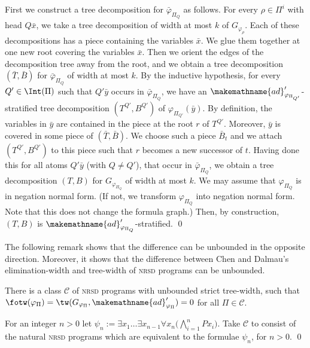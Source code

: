\documentclass{LMCS}
\newcommand{\nrsd}{\textsc{nrsd}}
\renewcommand{\phi}{\varphi}
\newcommand{\alte}{\makemathname{ad}}
\begin{document}
First we construct a tree decomposition for 
$\bar \phi_{\Pi_Q}$ as follows.
For every $\rho\in\Pi^i$ with head $Q\bar x$,
we take a tree decomposition 
of width at most $k$ of $G_{\phi_{\rho}}$. Each
of these decompositions has a piece containing 
the variables $\bar x$.
We glue them
together at one new root covering the variables
$\bar x$. Then we orient the edges of the decomposition tree 
away from the root, and we obtain a tree decomposition
$(\bar T,\bar B)$ for $\bar \phi_{\Pi_Q}$ of width at most $k$.
By the inductive 
hypothesis, for every $Q'\in\Int(\Pi)$ such that
$Q'\bar y$ occurs in $\bar \phi_{\Pi_Q}$,
we have an $\alte'_{\phi_{\Pi_{Q'}}}$-stratified tree decomposition $(T^{Q'},B^{Q'})$ of
$\phi_{\Pi_{Q'}}(\bar y)$. By definition, the variables in $\bar y$
are contained in the piece at the root $r$ of $T^{Q'}$. Moreover, $\bar y$
is covered in some piece of $(\bar T,\bar B)$. We choose such a piece $\bar B_t$
and we attach $(T^{Q'},B^{Q'})$
to this piece such that $r$ becomes a new successor of $t$. 
Having done this for all atoms $Q'\bar y$ (with $Q\neq Q'$), 
that occur in $\bar \phi_{\Pi_Q}$, we obtain a tree decomposition $(T,B)$ for 
$G_{\phi_{\Pi_Q}}$ of width at most $k$. We may assume that 
$\phi_{\Pi_Q}$ is in negation normal form. (If not, we transform 
$\phi_{\Pi_Q}$ into negation normal form. Note that this does not change
the formula graph.)
Then, by construction, $(T,B)$ is 
$\alte'_{\phi_{\Pi_Q}}$-stratified.
\qed

The following remark shows that the 
difference can be unbounded in the opposite direction. Moreover, it
shows that the difference between Chen and Dalmau's elimination-width 
and tree-width of \nrsd{} programs can be unbounded.

\begin{rem}\label{rem:fotw-better-datalogtw}
	There is a class $\mathcal C$ of \nrsd{} programs with unbounded strict tree-width,
	such that $\fotw(\phi_{\Pi})=\tw(G_{\phi_{\Pi}},\alte'_{\phi_{\Pi}})=0$ 
for all $\Pi\in\mathcal C$. 
\end{rem}
\proof
For an integer $n>0$
let 
$
\psi_n:=\exists x_1\ldots \exists x_{n-1}\forall x_n
\big(\bigwedge_{i=1}^{n}Px_i\big)$. 
Take $\mathcal C$ to consist of the natural \nrsd{} programs 
which are equivalent to the formulae $\psi_n$, for $n>0$. 
\qed
\end{document}
